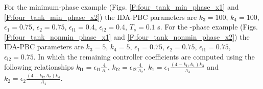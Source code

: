 For the minimum-phase example (Figs. \ref{F:four_tank_min_phase_x1} and 
\ref{F:four_tank_min_phase_x2}) the IDA-PBC parameters are 
$k_3 = 100$, $k_4 = 100$, $\epsilon_1 = 0.75$, $\epsilon_2 = 0.75$, 
$\epsilon_{\mathsf{I}1} = 0.4$, $\epsilon_{\mathsf{I}2} = 0.4$,
$T_s=0.1$ s.  For the \nonminimum-phase example
(Figs. \ref{F:four_tank_nonmin_phase_x1} and
\ref{F:four_tank_nonmin_phase_x2}) the IDA-PBC parameters are  
$k_3 = 5$, $k_4 = 5$, $\epsilon_1 = 0.75$, $\epsilon_2 = 0.75$, 
$\epsilon_{\mathsf{I}1} = 0.75$, $\epsilon_{\mathsf{I}2} = 0.75$.  In
which the remaining controller coefficients are computed using the
following relationships $k_{\mathsf{I}1} = \epsilon_{\mathsf{I}1}
\frac{4}{A_1}$, $k_{\mathsf{I}2} = \epsilon_{\mathsf{I}2}
\frac{4}{A_2}$, $k_1 = \epsilon_1 \frac{(4-k_{\mathsf{I}1} A_1)
  k_3}{A_3}$ and $k_2 = \epsilon_2 \frac{(4-k_{\mathsf{I}2} A_2)
  k_4}{A_4}$.
